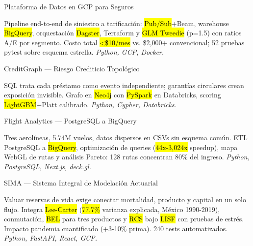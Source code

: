 \documentclass[10pt, letterpaper]{awesome-cv}
\begin{document}
\begin{cventries}

  \cventry
    {Plataforma de Datos en GCP para Seguros}
    {}
    {}
    {}
    {
      \begin{cvitems}
        \item {Pipeline end-to-end de siniestro a tarificación: \hl{Pub/Sub}+Beam, warehouse \hl{BigQuery}, orquestación \hl{Dagster}, Terraform y \hl{GLM Tweedie} (p=1.5) con ratios A/E por segmento. Costo total \hl{<\$10/mes} vs. \$2,000+ convencional; 52 pruebas pytest sobre esquema estrella. \textit{Python, GCP, Docker.}}
      \end{cvitems}
    }

  \cventry
    {CreditGraph — Riesgo Crediticio Topológico}
    {}
    {}
    {}
    {
      \begin{cvitems}
        \item {SQL trata cada préstamo como evento independiente; garantías circulares crean exposición invisible. Grafo en \hl{Neo4j} con \hl{PySpark} en Databricks, scoring \hl{LightGBM}+Platt calibrado. \textit{Python, Cypher, Databricks.}}
      \end{cvitems}
    }

  \cventry
    {Flight Analytics — PostgreSQL a BigQuery}
    {}
    {}
    {}
    {
      \begin{cvitems}
        \item {Tres aerolíneas, 5.74M vuelos, datos dispersos en CSVs sin esquema común. ETL PostgreSQL a \hl{BigQuery}, optimización de queries (\hl{44x-3,024x} speedup), mapa WebGL de rutas y análisis Pareto: 128 rutas concentran 80\% del ingreso. \textit{Python, PostgreSQL, Next.js, deck.gl.}}
      \end{cvitems}
    }

  \cventry
    {SIMA — Sistema Integral de Modelación Actuarial}
    {}
    {}
    {}
    {
      \begin{cvitems}
        \item {Valuar reservas de vida exige conectar mortalidad, producto y capital en un solo flujo. Integra \hl{Lee-Carter} (\hl{77.7\%} varianza explicada, México 1990-2019), conmutación, \hl{BEL} para tres productos y \hl{RCS} bajo \hl{LISF} con pruebas de estrés. Impacto pandemia cuantificado (+3-10\% prima). 240 tests automatizados. \textit{Python, FastAPI, React, GCP.}}
      \end{cvitems}
    }

\end{cventries}
\end{document}
